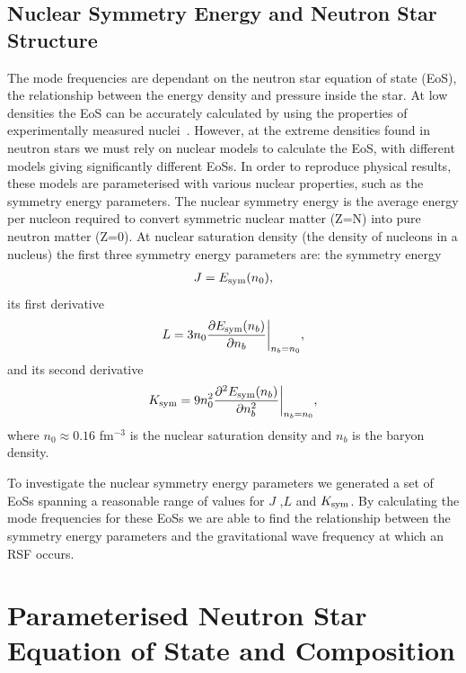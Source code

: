 \documentclass[fleqn,usenatbib]{mnras}
\begin{document}
\subsection{Nuclear Symmetry Energy and Neutron Star Structure}
\hspace{\parindent}The mode frequencies are dependant on the neutron star equation of state (EoS), the relationship between the energy density and pressure inside the star. At low densities the EoS can be accurately calculated by using the properties of experimentally measured nuclei~\citet{baym1971ground}. However, at the extreme densities found in neutron stars we must rely on nuclear models to calculate the EoS, with different models giving significantly different EoSs. In order to reproduce physical results, these models are parameterised with various nuclear properties, such as the symmetry energy parameters. The nuclear symmetry energy is the average energy per nucleon required to convert symmetric nuclear matter (Z=N) into pure neutron matter (Z=0). At nuclear saturation density (the density of nucleons in a nucleus) the first three symmetry energy parameters are: the symmetry energy
\begin{align}
J=E_{\rm sym}(n_0),    
\label{eq:sym_J}
\end{align}
\noindent its first derivative 
\begin{align}
L=3n_0\frac{\partial E_{\rm sym}(n_b)}{\partial n_b}\biggr\rvert_{n_b=n_0},  
\label{eq:sym_L}
\end{align}
\noindent and its second derivative
\begin{align}
K_{\rm sym}=9n_0^2\frac{\partial^2 E_{\rm sym}(n_b)}{\partial n_b^2}\biggr\rvert_{n_b=n_0},
\label{eq:sym_K}
\end{align}
\noindent where $n_0\approx 0.16$ fm$^{-3}$ is the nuclear saturation density and $n_b$ is the baryon density.

\hspace{\parindent}To investigate the nuclear symmetry energy parameters we generated a set of EoSs spanning a reasonable range of values for $J$ ,$L$ and $K_{\rm sym}$. By calculating the mode frequencies for these EoSs we are able to find the relationship between the symmetry energy parameters and the gravitational wave frequency at which an RSF occurs.







\section{Parameterised Neutron Star Equation of State and Composition}
\end{document}
